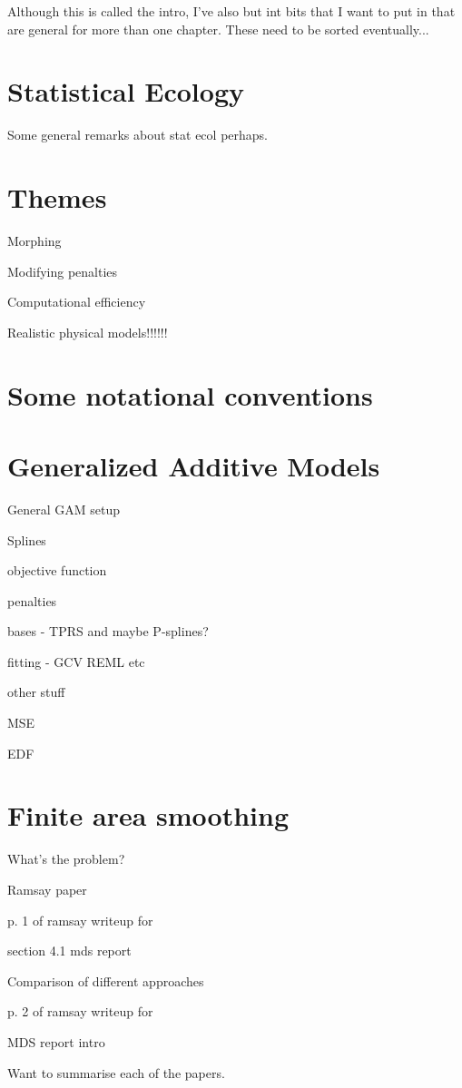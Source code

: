 Although this is called the intro, I've also but int bits that I want to put in that are general for more than one chapter. These need to be sorted eventually...

\section{Statistical Ecology}

Some general remarks about stat ecol perhaps.

\section{Themes}

\bi
	\item Morphing
	\item Modifying penalties
	\item Computational efficiency
	\item Realistic physical models!!!!!!
\ei


\section{Some notational conventions}



\section{Generalized Additive Models}

General GAM setup

\bi
\item Splines
\item objective function
\item penalties
\item bases - TPRS and maybe P-splines?
\item fitting - GCV REML etc
\item other stuff
	\bi
	\item MSE
	\item EDF
	\ei
\ei

\section{Finite area smoothing}

\bi
\item What's the problem?
\item Ramsay paper
	\bi
		\item p. 1 of ramsay writeup for \sch
		\item section 4.1 mds report
	\ei
\item Comparison of different approaches
	\bi
		\item p. 2 of ramsay writeup for \sch
		\item MDS report intro
		\item Want to summarise each of the papers.
	\ei
\ei




